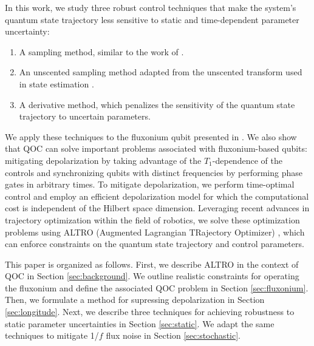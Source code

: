 In this work, we study three robust control techniques that
make the system's quantum state trajectory less sensitive
to static and time-dependent parameter uncertainty:
\begin{enumerate}
\item A sampling method, similar to the work of \cite{allen2019robust,
  ball2020software, carvalho2020error, khaneja2005optimal,
  reinhold2019controlling, rembold2020introduction}.
  \item An unscented sampling method adapted from the unscented transform used in
    state estimation \cite{howell2020direct, julier2004unscented,
      lee2013sigma, thangavel2020robust}.
  \item A derivative method, which penalizes the sensitivity of the quantum state trajectory
    to uncertain parameters.
\end{enumerate}
We apply these techniques to the fluxonium qubit presented in \cite{zhang2020universal}.
We also show that QOC can solve important problems associated with
fluxonium-based qubits: mitigating
depolarization by taking advantage of the $T_{1}$-dependence of the controls
and synchronizing qubits with distinct frequencies
by performing phase gates in arbitrary times.
To mitigate depolarization,
we perform time-optimal control and
employ an efficient depolarization model
for which the computational cost is independent of the
Hilbert space dimension.
Leveraging recent advances in trajectory optimization within the field of robotics, we
solve these optimization problems using ALTRO (Augmented Lagrangian TRajectory Optimizer)
\cite{howell2019altro}, which can enforce constraints on the quantum state trajectory
and control parameters.

This paper is organized as follows.
First, we describe ALTRO in the context of QOC
in Section \ref{sec:background}.
We outline realistic constraints for operating the fluxonium and
define the associated QOC problem in Section \ref{sec:fluxonium}.
Then, we formulate a method for supressing depolarization
in Section \ref{sec:longitude}. Next, we describe three techniques for achieving
robustness to static parameter uncertainties in Section \ref{sec:static}. We
adapt the same techniques to mitigate 1/$f$ flux noise
in Section \ref{sec:stochastic}.
